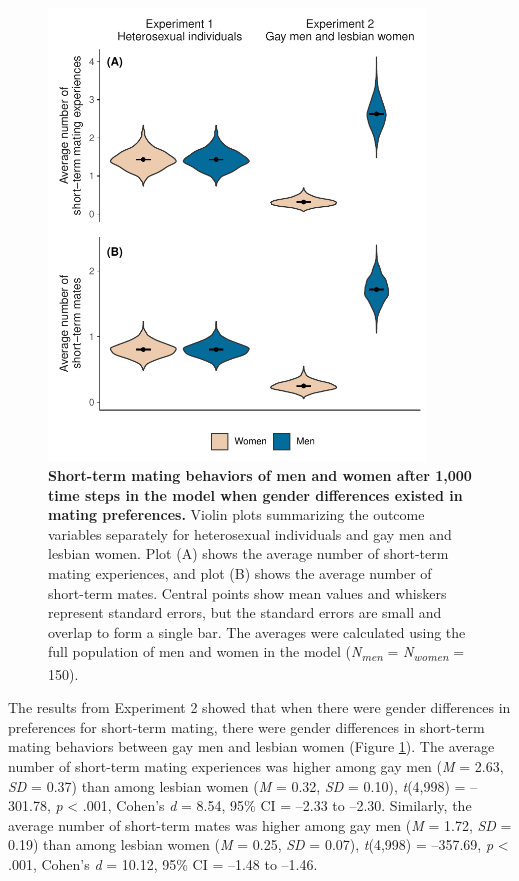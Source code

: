 \documentclass[
  11pt,
]{article}
\begin{document}
\begin{figure}[h]
  \centering
  \includegraphics[width=100mm]{figures/fig1_men_vs_women.pdf}
  \caption{\textbf{Short-term mating behaviors of men and women after 1,000 time steps in the model when gender differences existed in mating preferences.} Violin plots summarizing the outcome variables separately for heterosexual individuals and gay men and lesbian women. Plot (A) shows the average number of short-term mating experiences, and plot (B) shows the average number of short-term mates. Central points show mean values and whiskers represent standard errors, but the standard errors are small and overlap to form a single bar. The averages were calculated using the full population of men and women in the model (\textit{N\textsubscript{men}} = \textit{N\textsubscript{women}} = 150).}
  \label{fig:men_vs_women}
\end{figure}

The results from Experiment 2 showed that when there were gender
differences in preferences for short-term mating, there were gender
differences in short-term mating behaviors between gay men and lesbian
women (Figure \ref{fig:men_vs_women}). The average number of short-term
mating experiences was higher among gay men (\emph{M} = 2.63, \emph{SD}
= 0.37) than among lesbian women (\emph{M} = 0.32, \emph{SD} = 0.10),
\emph{t}(4,998) = --301.78, \emph{p} \textless{} .001, Cohen's \emph{d}
= 8.54, 95\% CI = --2.33 to --2.30. Similarly, the average number of
short-term mates was higher among gay men (\emph{M} = 1.72, \emph{SD} =
0.19) than among lesbian women (\emph{M} = 0.25, \emph{SD} = 0.07),
\emph{t}(4,998) = --357.69, \emph{p} \textless{} .001, Cohen's \emph{d}
= 10.12, 95\% CI = --1.48 to --1.46.
\end{document}
